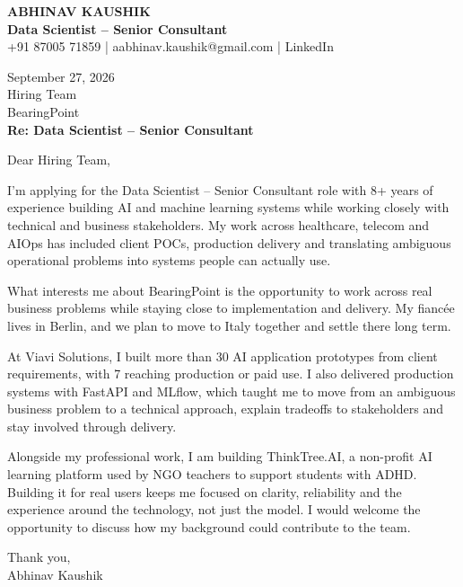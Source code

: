 \documentclass[10pt,a4paper]{article}
\begin{document}
\begin{center}
{\Large\bfseries ABHINAV KAUSHIK}\\[2pt]
{\bfseries Data Scientist – Senior Consultant}\\[2pt]
+91 87005 71859 \quad | \quad aabhinav.kaushik@gmail.com \quad | \quad LinkedIn
\end{center}
\vspace{8pt}
September 27, 2026\\[6pt]
Hiring Team\\
BearingPoint\\[4pt]
\textbf{Re: Data Scientist – Senior Consultant}

Dear Hiring Team,

I’m applying for the Data Scientist – Senior Consultant role with 8+ years of experience building AI and machine learning systems while working closely with technical and business stakeholders. My work across healthcare, telecom and AIOps has included client POCs, production delivery and translating ambiguous operational problems into systems people can actually use.

What interests me about BearingPoint is the opportunity to work across real business problems while staying close to implementation and delivery. My fiancée lives in Berlin, and we plan to move to Italy together and settle there long term.

At Viavi Solutions, I built more than 30 AI application prototypes from client requirements, with 7 reaching production or paid use. I also delivered production systems with FastAPI and MLflow, which taught me to move from an ambiguous business problem to a technical approach, explain tradeoffs to stakeholders and stay involved through delivery.

Alongside my professional work, I am building ThinkTree.AI, a non-profit AI learning platform used by NGO teachers to support students with ADHD. Building it for real users keeps me focused on clarity, reliability and the experience around the technology, not just the model. I would welcome the opportunity to discuss how my background could contribute to the team.

Thank you,\\
Abhinav Kaushik
\end{document}
